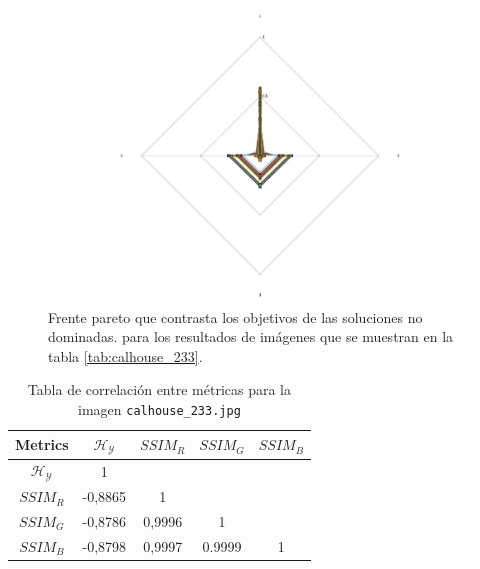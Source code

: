    \begin{figure}[H]
    \centering
    \includegraphics[width=\textwidth]{./Figures/calhouse_233/calhouse_233_2.jpg}
    \caption{Frente pareto que contrasta los objetivos de las soluciones no dominadas. para los resultados de imágenes que se muestran en la tabla \ref{tab:calhouse_233}.}
    \label{fig:calhouse2332fp}
    \end{figure}

\begin{table}[H]
\setlength{\abovecaptionskip}{2pt plus 3pt minus 2pt} %
\caption[Parámetros de entrada para $MOPSO$]{Tabla de correlación entre métricas para la imagen \texttt{calhouse\_233.jpg}}
\begin{center}
 \begin{tabular}{||c | c c c c||} 
 \hline
Metrics & $\mathscr{H_Y}$ & $SSIM_R$ & $SSIM_G$ & $SSIM_B$ \\ 
\hline
$\mathscr{H_Y}$ & 1 &  &  & \\ 
\hline
$SSIM_R$ & -0,8865 & 1 &  \\ 
\hline
$SSIM_G$ & -0,8786 & 0,9996  & 1  & \\ 
\hline
$SSIM_B$ & -0,8798 & 0,9997  & 0.9999  & 1 \\ 
\hline
\end{tabular}
\end{center}
\label{table:correlacion}
\end{table}

